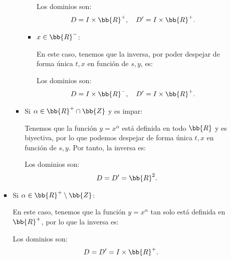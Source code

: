 \documentclass[12pt]{article}
\begin{document}
\begin{ejercicio}[6 puntos]
\begin{enumerate}
\begin{itemize}
\begin{itemize}
\begin{itemize}
\begin{itemize}
                        Los dominios son:
                        \begin{align*}
                            D=I\times \bb{R}^+,\quad D'=I\times \bb{R}^+.
                        \end{align*}

                        \item $x\in \bb{R}^-$:
                        
                        En este caso, tenemos que la inversa, por poder despejar de forma única $t,x$ en función de $s,y$, es:

                        Los dominios son:
                        \begin{align*}
                            D=I \times \bb{R}^-,\quad D'=I \times \bb{R}^+.
                        \end{align*}
                    \end{itemize}

                    \item Si $\alpha\in \bb{R}^+\cap \bb{Z}$ y es impar:
                    
                    Tenemos que la función $y=x^\alpha$ está definida en todo $\bb{R}$ y es biyectiva, por lo que podemos despejar de forma única $t,x$ en función de $s,y$.
                    Por tanto, la inversa es:

                    Los dominios son:
                    \begin{align*}
                        D=D'=\bb{R}^2.
                    \end{align*}
                \end{itemize}

                \item Si $\alpha\in \bb{R}^+\setminus \bb{Z}$:
                
                En este caso, tenemos que la función $y=x^\alpha$ tan solo está definida en $\bb{R}^+$, por lo que la inversa es:

                Los dominios son:
                \begin{align*}
                    D=D'=I \times \bb{R}^+.
                \end{align*}
            \end{itemize}


\end{itemize}
\end{enumerate}
\end{ejercicio}
\end{document}
